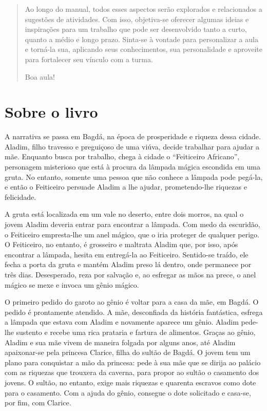 \documentclass[11pt]{extarticle}
\begin{document}
\begin{abstract}
Ao longo do manual, todos esses aspectos serão explorados e relacionados a sugestões de atividades. Com isso, objetiva-se oferecer algumas ideias e inspirações para um trabalho que pode ser desenvolvido tanto a curto, quanto a médio e longo prazo. Sinta-se à vontade para personalizar a aula e torná-la sua, aplicando seus conhecimentos, sua 
personalidade e aproveite para fortalecer seu vínculo com a turma.

Boa aula!

\end{abstract}

\section{Sobre o livro}
A narrativa se passa em Bagdá, na época de prosperidade e riqueza dessa cidade.
Aladim, filho travesso e preguiçoso de uma viúva, decide trabalhar para ajudar a mãe.
Enquanto busca por trabalho, chega à cidade o “Feiticeiro Africano”, personagem misterioso que está à procura da lâmpada mágica escondida em uma gruta. No entanto, somente uma pessoa que não conhece a lâmpada pode pegá-la, e então o Feiticeiro persuade Aladim a lhe ajudar, prometendo-lhe riquezas e felicidade.

A gruta está localizada em um vale no deserto, entre dois morros, na qual o jovem Aladim deveria entrar para encontrar a lâmpada. Com medo da escuridão, o Feiticeiro empresta-lhe um anel mágico, que o iria proteger de qualquer perigo. O Feiticeiro, no entanto, é grosseiro e maltrata Aladim que, por isso, após encontrar a lâmpada, hesita em entregá-la ao Feiticeiro. Sentido-se traído, ele fecha a porta da gruta e mantém Aladim preso lá dentro, onde permanece por três dias. Desesperado, reza por salvação e, ao esfregar as mãos na prece, o anel mágico se mexe e invoca um gênio mágico.

O primeiro pedido do garoto ao gênio é voltar para a casa da mãe, em Bagdá. O pedido é prontamente atendido. A mãe, desconfiada da história fantástica, esfrega a lâmpada que estava com Aladim e novamente aparece um gênio. Aladim pede-lhe sustento e recebe uma rica prataria e fartura de alimentos. Graças ao gênio, Aladim e sua mãe vivem de maneira folgada por alguns anos, até Aladim apaixonar-se pela princesa Clarice, filha do sultão de Bagdá. O jovem tem um plano para conquistar a mão da princesa: pede à sua mãe que se dirija ao palácio com as riquezas que trouxera da caverna, para propor ao sultão o casamento dos jovens. O sultão, no entanto, exige mais riquezas e quarenta escravos como dote para o casamento. Com a ajuda do gênio, consegue o dote solicitado e casa-se, por fim, com Clarice.
\end{document}
